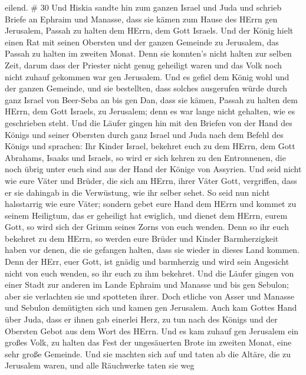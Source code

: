 eilend. \# 30  Und Hiskia sandte hin zum ganzen Israel und
Juda und schrieb Briefe an Ephraim und Manasse, dass sie kämen zum Hause
des HErrn gen Jerusalem, Passah zu halten dem HErrn, dem Gott Israels.
 Und der König hielt einen Rat mit seinen Obersten und der
ganzen Gemeinde zu Jerusalem, das Passah zu halten im zweiten Monat.
 Denn sie konnten's nicht halten zur selben Zeit, darum dass
der Priester nicht genug geheiligt waren und das Volk noch nicht zuhauf
gekommen war gen Jerusalem.  Und es gefiel dem König wohl
und der ganzen Gemeinde,  und sie bestellten, dass solches
ausgerufen würde durch ganz Israel von Beer-Seba an bis gen Dan, dass
sie kämen, Passah zu halten dem HErrn, dem Gott Israels, zu Jerusalem;
denn es war lange nicht gehalten, wie es geschrieben steht. 
Und die Läufer gingen hin mit den Briefen von der Hand des Königs und
seiner Obersten durch ganz Israel und Juda nach dem Befehl des Königs
und sprachen: Ihr Kinder Israel, bekehret euch zu dem HErrn, dem Gott
Abrahams, Isaaks und Israels, so wird er sich kehren zu den Entronnenen,
die noch übrig unter euch sind aus der Hand der Könige von Assyrien.
 Und seid nicht wie eure Väter und Brüder, die sich am
HErrn, ihrer Väter Gott, vergriffen, dass er sie dahingab in die
Verwüstung, wie ihr selber sehet.  So seid nun nicht
halsstarrig wie eure Väter; sondern gebet eure Hand dem HErrn und kommet
zu seinem Heiligtum, das er geheiligt hat ewiglich, und dienet dem
HErrn, eurem Gott, so wird sich der Grimm seines Zorns von euch wenden.
 Denn so ihr euch bekehret zu dem HErrn, so werden eure
Brüder und Kinder Barmherzigkeit haben vor denen, die sie gefangen
halten, dass sie wieder in dieses Land kommen. Denn der HErr, euer Gott,
ist gnädig und barmherzig und wird sein Angesicht nicht von euch wenden,
so ihr euch zu ihm bekehret.  Und die Läufer gingen von
einer Stadt zur anderen im Lande Ephraim und Manasse und bis gen
Sebulon; aber sie verlachten sie und spotteten ihrer.  Doch
etliche von Asser und Manasse und Sebulon demütigten sich und kamen gen
Jerusalem.  Auch kam Gottes Hand über Juda, dass er ihnen
gab einerlei Herz, zu tun nach des Königs und der Obersten Gebot aus dem
Wort des HErrn.  Und es kam zuhauf gen Jerusalem ein großes
Volk, zu halten das Fest der ungesäuerten Brote im zweiten Monat, eine
sehr große Gemeinde.  Und sie machten sich auf und taten ab
die Altäre, die zu Jerusalem waren, und alle Räuchwerke taten sie weg
